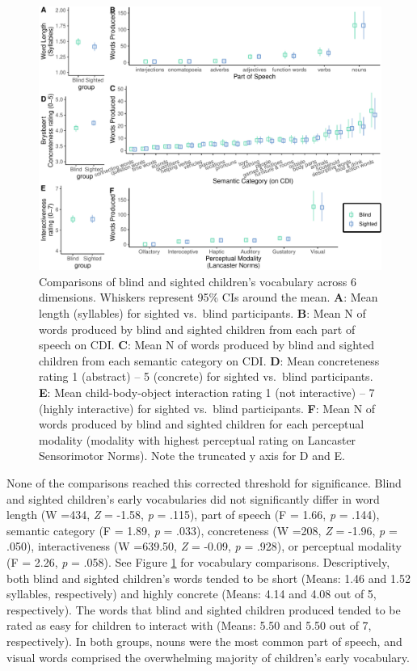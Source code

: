 \documentclass[
  man,floatsintext]{apa6}
\begin{document}
\begin{figure}
\centering
\includegraphics{VI_CDI_manuscript_files/figure-latex/vocab-comparison-1.pdf}
\caption{\label{fig:vocab-comparison}Comparisons of blind and sighted children's vocabulary across 6 dimensions. Whiskers represent 95\% CIs around the mean. \textbf{A}: Mean length (syllables) for sighted vs.~blind participants. \textbf{B}: Mean N of words produced by blind and sighted children from each part of speech on CDI. \textbf{C}: Mean N of words produced by blind and sighted children from each semantic category on CDI. \textbf{D}: Mean concreteness rating 1 (abstract) -- 5 (concrete) for sighted vs.~blind participants. \textbf{E}: Mean child-body-object interaction rating 1 (not interactive) -- 7 (highly interactive) for sighted vs.~blind participants. \textbf{F}: Mean N of words produced by blind and sighted children for each perceptual modality (modality with highest perceptual rating on Lancaster Sensorimotor Norms). Note the truncated y axis for D and E.}
\end{figure}

None of the comparisons reached this corrected threshold for significance. Blind and sighted children's early vocabularies did not significantly differ in word length (W =434, \emph{Z} = -1.58, \emph{p} = .115), part of speech (F = 1.66, \emph{p} = .144), semantic category (F = 1.89, \emph{p} = .033), concreteness (W =208, \emph{Z} = -1.96, \emph{p} = .050), interactiveness (W =639.50, \emph{Z} = -0.09, \emph{p} = .928), or perceptual modality (F = 2.26, \emph{p} = .058). See Figure \ref{fig:vocab-comparison} for vocabulary comparisons. Descriptively, both blind and sighted children's words tended to be short (Means: 1.46 and 1.52 syllables, respectively) and highly concrete (Means: 4.14 and 4.08 out of 5, respectively). The words that blind and sighted children produced tended to be rated as easy for children to interact with (Means: 5.50 and 5.50 out of 7, respectively). In both groups, nouns were the most common part of speech, and visual words comprised the overwhelming majority of children's early vocabulary.
\end{document}

